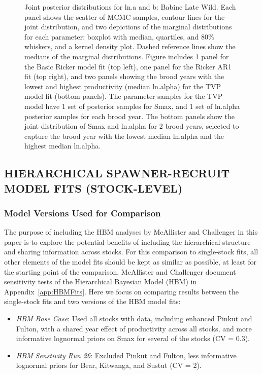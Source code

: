\documentclass[french,11pt]{book}
\begin{document}
\begin{figure}[htb]

{\centering {} 

}

\caption{Joint posterior distributions for ln.a and b: Babine Late Wild. Each panel shows the scatter of MCMC samples, contour lines for the joint distribution, and two depictions of the marginal distributions for each parameter: boxplot with median, quartiles, and 80\% whiskers, and a kernel density plot. Dashed reference lines show the medians of the marginal distributions. Figure includes 1 panel for the Basic Ricker model fit (top left), one panel for the Ricker AR1 fit (top right), and two panels showing the brood years with the lowest and highest productivity (median ln.alpha) for the TVP model fit (bottom panels). The parameter samples for the TVP model have 1 set of posterior samples for Smax, and 1 set of ln.alpha posterior samples for each brood year. The bottom panels show the joint distribution of Smax and ln.alpha for 2 brood years, selected to capture the brood year with the lowest median ln.alpha and the highest median ln.alpha.}\label{fig:JoinPostBabLW}
\end{figure}
\clearpage

\subsection{HIERARCHICAL SPAWNER-RECRUIT MODEL FITS (STOCK-LEVEL)}\label{HBMResultsComp}

\subsubsection{Model Versions Used for Comparison}\label{model-versions-used-for-comparison}

The purpose of including the HBM analyses by McAllister and Challenger in this paper is to explore the potential benefits of including the hierarchical structure and sharing information across stocks. For this comparison to single-stock fits, all other elements of the model fits should be kept as similar as possible, at least for the starting point of the comparison. McAllister and Challenger document sensitivity tests of the Hierarchical Bayesian Model (HBM) in Appendix~\ref{app:HBMFits}. Here we focus on comparing results between the single-stock fits and two versions of the HBM model fits:
\begin{itemize}

\item
  \emph{HBM Base Case}: Used all stocks with data, including enhanced Pinkut and Fulton, with a shared year effect of productivity across all stocks, and more informative lognormal priors on Smax for several of the stocks (CV = 0.3).
\item
  \emph{HBM Senstivity Run 26}: Excluded Pinkut and Fulton, less informative lognormal priors for Bear, Kitwanga, and Sustut (CV = 2).
\end{itemize}
\end{document}
